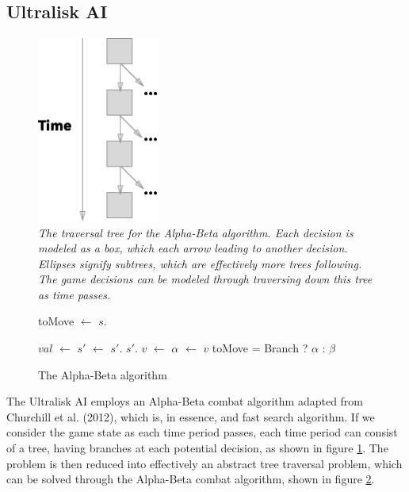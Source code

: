 \documentclass[twocolumn]{article}
\begin{document}
\subsection{Ultralisk AI}
\begin{figure}[ht]
	\begin{center}
		\includegraphics[width=4cm]{tree.png}
	\end{center}
	\caption{\textit{The traversal tree for the Alpha-Beta algorithm. Each decision is modeled as a box, which each arrow leading to another decision. Ellipses signify subtrees, which are effectively more trees following. The game decisions can be modeled through traversing down this tree as time passes. }}
	\label{fig:combatTree}
\end{figure}
\begin{figure}
	\begin{algorithmic}
	\ElsIf
	    \EndIf
	\EndIf
	
	\State toMove $\gets$ $s$.
	
			\State $val$ $\gets$ 
		\Else
			\State $s'$ $\gets$ 
				\State $s'$.
			\EndIf
			\State $s'$.
			\State $v$ $\gets$ 
		\EndIf
			\State $\alpha$ $\gets$ $v$
		\EndIf
	\EndWhile
	\Return toMove = Branch ? $\alpha$ : $\beta$
	\EndFunction

	\end{algorithmic}
	\caption{The Alpha-Beta algorithm}
	\label{fig:alpha-beta}
\end{figure}
The Ultralisk AI employs an Alpha-Beta combat algorithm adapted from Churchill et al. (2012), which is, in essence, and fast search algorithm. If we consider the game state as each time period passes, each time period can consist of a tree, having branches at each potential decision, as shown in figure \ref{fig:combatTree}. The problem is then reduced into effectively an abstract tree traversal problem, which can be solved through the Alpha-Beta combat algorithm, shown in figure \ref{fig:alpha-beta}.
\end{document}
